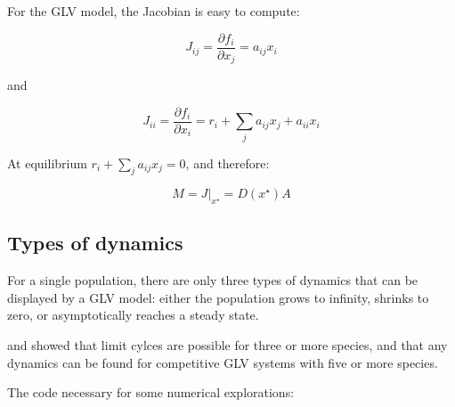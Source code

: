 \documentclass[]{book}
\begin{document}
For the GLV model, the Jacobian is easy to compute:

\[
J_{ij} = \frac{\partial f_i}{\partial x_j} = a_{ij} x_i
\]

and

\[
J_{ii} = \frac{\partial f_i}{\partial x_i} = r_i + \sum_j a_{ij} x_j + a_{ii} x_i
\]

At equilibrium \(r_i + \sum_j a_{ij} x_j = 0\), and therefore:

\[
M = \left. {J} \right|_{ {x}^\star} = D(x^\star)A
\]

\hypertarget{types-of-dynamics}{%
\subsection{Types of dynamics}\label{types-of-dynamics}}

For a single population, there are only three types of dynamics that can be displayed by a GLV model: either the population grows to infinity, shrinks to zero, or asymptotically reaches a steady state.

\citet{smale1976differential} and \citet{hirsch1982systems} showed that limit cylces are possible for three or more species, and that any dynamics can be found for competitive GLV systems with five or more species.

The code necessary for some numerical explorations:
\end{document}
